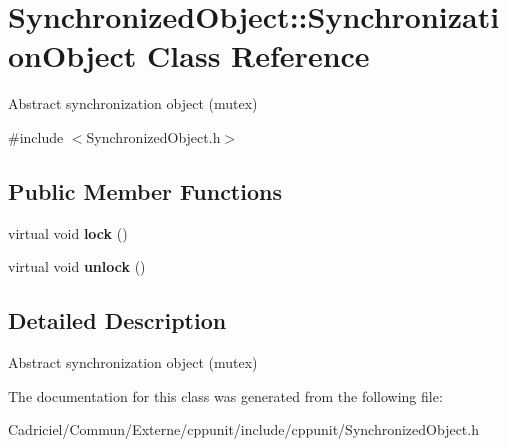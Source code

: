 \hypertarget{class_synchronized_object_1_1_synchronization_object}{\section{Synchronized\-Object\-:\-:Synchronization\-Object Class Reference}
\label{class_synchronized_object_1_1_synchronization_object}
}


Abstract synchronization object (mutex)  




{\ttfamily \#include $<$Synchronized\-Object.\-h$>$}

\subsection*{Public Member Functions}
\begin{DoxyCompactItemize}
\item 
\hypertarget{class_synchronized_object_1_1_synchronization_object_a2c1a4b7e3e3a8f8993140fb1fc9dabe0}{virtual void {\bfseries lock} ()}\label{class_synchronized_object_1_1_synchronization_object_a2c1a4b7e3e3a8f8993140fb1fc9dabe0}

\item 
\hypertarget{class_synchronized_object_1_1_synchronization_object_a2af2a59901a0cdc673dc8729840fe797}{virtual void {\bfseries unlock} ()}\label{class_synchronized_object_1_1_synchronization_object_a2af2a59901a0cdc673dc8729840fe797}

\end{DoxyCompactItemize}


\subsection{Detailed Description}
Abstract synchronization object (mutex) 

The documentation for this class was generated from the following file\-:\begin{DoxyCompactItemize}
\item 
Cadriciel/\-Commun/\-Externe/cppunit/include/cppunit/Synchronized\-Object.\-h\end{DoxyCompactItemize}

